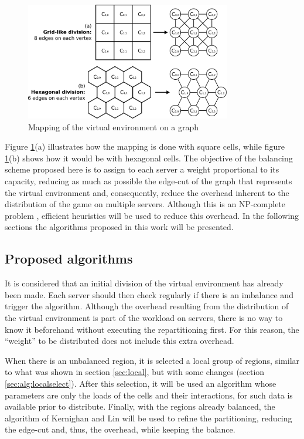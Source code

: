 \begin{figure}
\centering
\includegraphics[width=0.8\textwidth]{images/mapping}
\caption{Mapping of the virtual environment on a graph}
\label{fig:mapping}
\end{figure}

Figure \ref{fig:mapping}(a) illustrates how the mapping is done with square cells, while figure \ref{fig:mapping}(b) shows how it would be with hexagonal cells. The objective of the balancing scheme proposed here is to assign to each server a weight proportional to its capacity, reducing as much as possible the edge-cut of the graph that represents the virtual environment and, consequently, reduce the overhead inherent to the distribution of the game on multiple servers. Although this is an NP-complete problem \cite{feder1999cgp}, efficient heuristics will be used to reduce this overhead. In the following sections the algorithms proposed in this work will be presented.

\subsection{Proposed algorithms}
\label{sec:alg}
	
It is considered that an initial division of the virtual environment has already been made. Each server should then check regularly if there is an imbalance and trigger the algorithm. Although the overhead resulting from the distribution of the virtual environment is part of the workload on servers, there is no way to know it beforehand without executing the repartitioning first. For this reason, the ``weight'' to be distributed does not include this extra overhead.

When there is an unbalanced region, it is selected a local group of regions, similar to what was shown in section \ref{sec:local}, but with some changes (section \ref{sec:alg:localselect}). After this selection, it will be used an algorithm whose parameters are only the loads of the cells and their interactions, for such data is available prior to distribute. Finally, with the regions already balanced, the algorithm of Kernighan and Lin \cite{kernighan1970ehp} will be used to refine the partitioning, reducing the edge-cut and, thus, the overhead, while keeping the balance.

